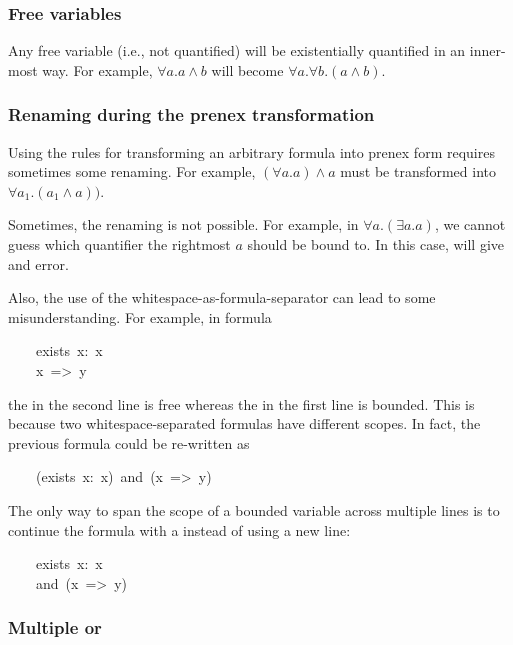 \subsubsection{Free variables}\label{sec-free-variables}%

\noindent Any free variable (i.e., not quantified) will be existentially quantified
in an inner-most way. For example, $\forall a. a \wedge b$ will become
$\forall a. \forall b. (a \wedge b)$.%

\subsubsection{Renaming during the prenex transformation}\label{sec-renaming-during-the-prenex-transformation}%

\noindent Using the rules for transforming an arbitrary formula into prenex form
requires sometimes some renaming. For example, $(\forall a. a) \wedge a$
must be transformed into $\forall a_1. (a_1 \wedge a))$.%

Sometimes, the renaming is not possible. For example, in
$\forall a. (\exists a. a)$, we cannot guess which quantifier the
rightmost $a$ should be bound to. In this case,  will give and
error.%

Also, the use of the whitespace-as-formula-separator can lead to some
misunderstanding. For example, in formula%
\begin{mdpre}%
\noindent~~~~{exists}~x:~x\\
~~~~x~=\textgreater{}~y%
\end{mdpre}\noindent the  in the second line is free whereas the  in the first line
is bounded. This is because two whitespace-separated formulas have
different scopes. In fact, the previous formula could be re-written as
\begin{mdpre}%
\noindent~~~~({exists}~x:~x)~and~(x~=\textgreater{}~y)%
\end{mdpre}\noindent The only way to span the scope of a bounded variable across multiple lines
is to continue the formula with a  instead of using a new line:
\begin{mdpre}%
\noindent~~~~{exists}~x:~x\\
~~~~and~(x~=\textgreater{}~y)%
\end{mdpre}
\subsubsection{Multiple  or }\label{sec-multiple-exists-or-forall}%


